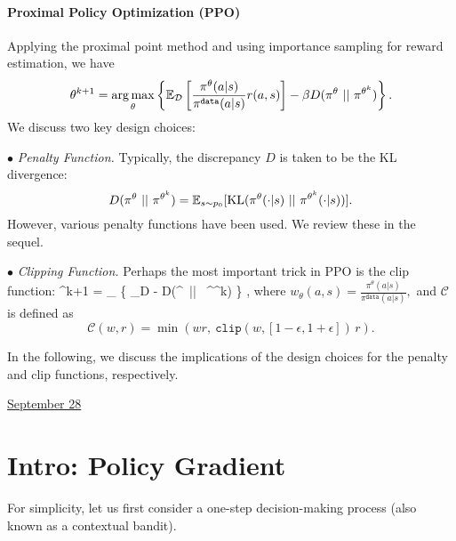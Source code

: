 \documentclass[letterpaper,11pt]{article}
\begin{document}
\paragraph{Proximal Policy Optimization (PPO)}

Applying the proximal point method and using importance sampling for reward estimation, we have
$$
\theta^{k+1} = \operatorname*{arg\,max}_{\theta} \left\{ \mathbb{E}_{\mathcal D} \left[ 
\frac{\pi^\theta(a|s)}{\pi^{\mathtt{data}}(a|s)}
r(a,s) \right] - \beta D(\pi^\theta~||~ \pi^{\theta^{k}}) \right\} .
$$
We discuss two key design choices: 

\noindent$\bullet$ \emph{Penalty Function.}  
Typically, the discrepancy $D$ is taken to be the KL divergence:
$$
D(\pi^\theta~||~ \pi^{\theta^{k}})
=  
\mathbb{E}_{s \sim p_0}[\mathrm{KL}(\pi^\theta(\cdot | s)~||~ \pi^{\theta^{k}}(\cdot | s))].
$$
However, various penalty functions have been used. We review these in the sequel.

\noindent$\bullet$ \emph{Clipping Function.}  
Perhaps the most important trick in PPO is the clip function:
\bb 
\theta^{k+1} = \argmax_{\theta} \left\{ \E_{\mathcal D}  - \beta D(\pi^\theta~||~ \pi^{\theta^{k}}) \right\} ,
\ee 
where 
$
w_\theta(a,s) = \frac{\pi^\theta(a|s)}{\pi^{\mathtt{data}}(a|s)},
$
and $\mathcal C$ is defined as
$$
\mathcal C(w, r) = \min(w r, ~ \mathtt{clip}(w, [1-\epsilon, 1+\epsilon]) \, r ).
$$

In the following, we discuss the implications of the design choices for the penalty and clip functions, respectively.





\clearpage


\href{run:2025-09-28.tex}{\Huge September 28} 

\section{Intro: Policy Gradient} 


For simplicity, let us first 
consider a one-step decision-making process (also known as a contextual bandit).  
\end{document}
